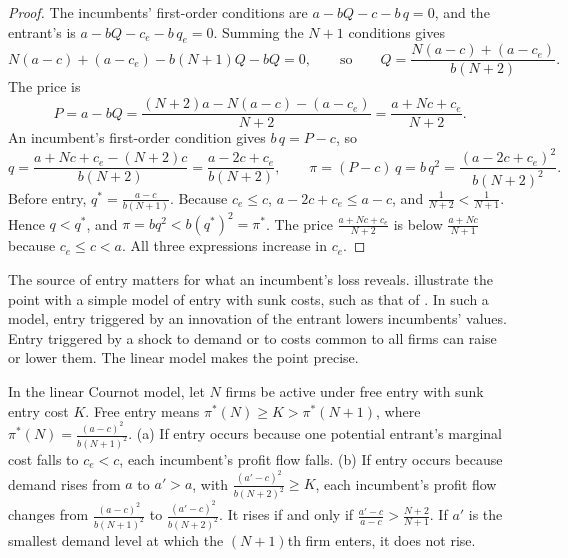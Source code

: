 \begin{proof}
The incumbents' first-order conditions are $a - bQ - c - b\,q = 0$, and the entrant's is
$a - bQ - c_e - b\,q_e = 0$. Summing the $N+1$ conditions gives
\begin{equation*}
  N(a-c) + (a - c_e) - b(N+1)Q - bQ = 0, \qquad\text{so}\qquad
  Q = \frac{N(a-c) + (a - c_e)}{b(N+2)} .
\end{equation*}
The price is
\begin{equation*}
  P = a - bQ = \frac{(N+2)a - N(a-c) - (a - c_e)}{N+2} = \frac{a + Nc + c_e}{N+2}.
\end{equation*}
An incumbent's first-order condition gives $b\,q = P - c$, so
\begin{equation*}
  q = \frac{a + Nc + c_e - (N+2)c}{b(N+2)} = \frac{a - 2c + c_e}{b(N+2)}, \qquad
  \pi = (P - c)\,q = b\,q^2 = \frac{(a - 2c + c_e)^2}{b(N+2)^2}.
\end{equation*}
Before entry, $q^* = \frac{a-c}{b(N+1)}$. Because $c_e \le c$, $a - 2c + c_e \le a - c$, and
$\frac{1}{N+2} < \frac{1}{N+1}$. Hence $q < q^*$, and $\pi = bq^2 < b(q^*)^2 = \pi^*$. The price
$\frac{a + Nc + c_e}{N+2}$ is below $\frac{a + Nc}{N+1}$ because $c_e \le c < a$. All three expressions increase
in $c_e$.
\end{proof}

The source of entry matters for what an incumbent's loss reveals. \citet[p.~447, n.~4]{WhinstonCollins1992}
illustrate the point with a simple model of entry with sunk costs, such as that of \citet{MankiwWhinston1986}.
In such a model, entry triggered by an innovation of the entrant lowers incumbents' values. Entry triggered by a shock to demand or to costs
common to all firms can raise or lower them. The linear model makes the point precise.

\begin{proposition}\label{prop:09-entry-source}
In the linear Cournot model, let $N$ firms be active under free entry with sunk entry cost $K$. Free entry means
$\pi^*(N) \ge K > \pi^*(N+1)$, where $\pi^*(N) = \frac{(a-c)^2}{b(N+1)^2}$. (a) If entry occurs because one
potential entrant's marginal cost falls to $c_e < c$, each incumbent's profit flow falls. (b) If entry occurs
because demand rises from $a$ to $a' > a$, with $\frac{(a'-c)^2}{b(N+2)^2} \ge K$, each incumbent's profit flow
changes from $\frac{(a-c)^2}{b(N+1)^2}$ to $\frac{(a'-c)^2}{b(N+2)^2}$. It rises if and only if
$\frac{a'-c}{a-c} > \frac{N+2}{N+1}$. If $a'$ is the smallest demand level at which the $(N+1)$th firm enters, it
does not rise.
\end{proposition}

